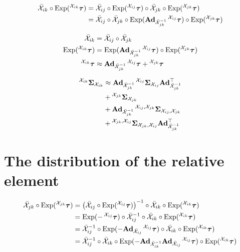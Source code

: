 \begin{subequations}
\begin{align}
    \bar{\cX}_{ik} \circ \Exp(\prescript{\cX_{ik}}{}{\vectau}) &= \bar{\cX}_{ij} \circ \Exp(\prescript{\cX_{ij}}{}{\vectau}) \circ \bar{\cX}_{jk} \circ \Exp(\prescript{\cX_{jk}}{}{\vectau})\\
    &= \bar{\cX}_{ij} \circ \bar{\cX}_{jk} \circ \Exp(\mAd_{\bar{\cX}_{jk}^{-1}} \prescript{\cX_{ij}}{}{\vectau}) \circ \Exp(\prescript{\cX_{jk}}{}{\vectau})
\end{align}
\end{subequations}

\begin{align}
    \bar{\cX}_{ik} &= \bar{\cX}_{ij} \circ \bar{\cX}_{jk}\\
    \Exp(\prescript{\cX_{ik}}{}{\vectau}) &= \Exp(\mAd_{\bar{\cX}_{jk}^{-1}} \prescript{\cX_{ij}}{}{\vectau}) \circ \Exp(\prescript{\cX_{jk}}{}{\vectau})\\
    \prescript{\cX_{ik}}{}{\vectau} &\approx \mAd_{\bar{\cX}_{jk}^{-1}} \prescript{\cX_{ij}}{}{\vectau} + \prescript{\cX_{jk}}{}{\vectau}
\end{align}

\begin{align}
  \prescript{\cX_{ik}}{}{\matSigma}_{\cX_{ik}} &\approx \mAd_{\bar{\cX}_{jk}^{-1}} \prescript{\cX_{ij}}{}{\matSigma_{\cX_{ij}}} \mAd_{\bar{\cX}_{jk}^{-1}}\trans\\
    &+ \prescript{\cX_{jk}}{}{\matSigma_{\cX_{jk}}}\\
    &+ \mAd_{\bar{\cX}_{jk}^{-1}} \prescript{\cX_{ij}, \cX_{jk}}{}{\matSigma_{\cX_{ij}, \cX_{jk}}}\\
    &+ \prescript{\cX_{jk}, \cX_{ij}}{}{\matSigma_{\cX_{jk}, \cX_{ij}}} \mAd_{\bar{\cX}_{jk}^{-1}}\trans
\end{align}

\section{The distribution of the relative element}

\begin{subequations}
\begin{align}
    \bar{\cX}_{jk} \circ \Exp(\prescript{\cX_{jk}}{}{\vectau}) &= \left( \bar{\cX}_{ij} \circ \Exp(\prescript{\cX_{ij}}{}{\vectau}) \right)^{-1} \circ \bar{\cX}_{ik} \circ \Exp(\prescript{\cX_{ik}}{}{\vectau})\\
    &= \Exp(-\prescript{\cX_{ij}}{}{\vectau}) \circ \bar{\cX}_{ij}^{-1} \circ \bar{\cX}_{ik} \circ \Exp(\prescript{\cX_{ik}}{}{\vectau})\\
    &= \bar{\cX}_{ij}^{-1} \circ \Exp(- \mAd_{\bar{\cX}_{ij}} \prescript{\cX_{ij}}{}{\vectau}) \circ \bar{\cX}_{ik} \circ \Exp(\prescript{\cX_{ik}}{}{\vectau})\\
    &= \bar{\cX}_{ij}^{-1} \circ \bar{\cX}_{ik} \circ \Exp(- \mAd_{\bar{\cX}_{ik}^{-1}} \mAd_{\bar{\cX}_{ij}} \prescript{\cX_{ij}}{}{\vectau}) \circ \Exp(\prescript{\cX_{ik}}{}{\vectau})
\end{align}
\end{subequations}

